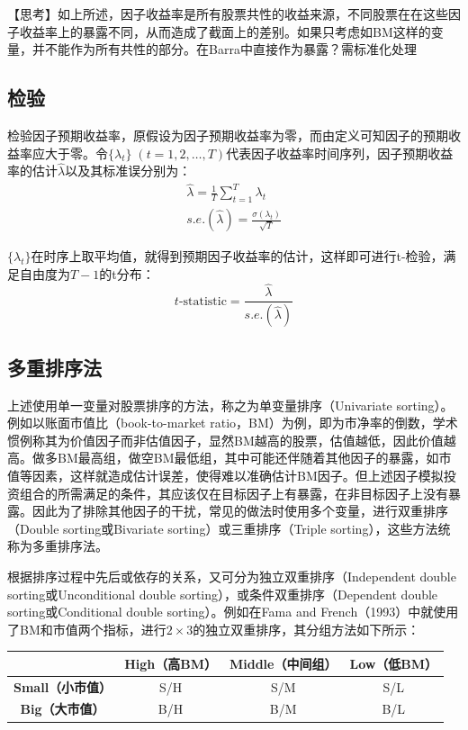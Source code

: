 \documentclass[11pt]{article}
\begin{document}
【思考】如上所述，因子收益率是所有股票共性的收益来源，不同股票在在这些因子收益率上的暴露不同，从而造成了截面上的差别。如果只考虑如BM这样的变量，并不能作为所有共性的部分。在Barra中直接作为暴露？需标准化处理

\subsection{检验}

检验因子预期收益率，原假设为因子预期收益率为零，而由定义可知因子的预期收益率应大于零。令$\{\lambda_t\} \; (t=1,2,\dots,T)$代表因子收益率时间序列，因子预期收益率的估计$\hat{\lambda}$以及其标准误分别为：
\begin{gather*}
    \hat{\lambda} = \frac{1}{T}\sum_{t=1}^{T} \lambda_t \\
    s.e.(\hat{\lambda}) = \frac{\sigma(\lambda_t)}{\sqrt{T}}
\end{gather*}

$\{\lambda_t\}$在时序上取平均值，就得到预期因子收益率的估计，这样即可进行t-检验，满足自由度为$T-1$的t分布：
\begin{equation*}
    t\text{-statistic} = \frac{\hat{\lambda}}{s.e.(\hat{\lambda})}
\end{equation*}

\subsection{多重排序法}

上述使用单一变量对股票排序的方法，称之为单变量排序（Univariate sorting）。例如以账面市值比（book-to-market ratio，BM）为例，即为市净率的倒数，学术惯例称其为价值因子而非估值因子，显然BM越高的股票，估值越低，因此价值越高。做多BM最高组，做空BM最低组，其中可能还伴随着其他因子的暴露，如市值等因素，这样就造成估计误差，使得难以准确估计BM因子。但上述因子模拟投资组合的所需满足的条件，其应该仅在目标因子上有暴露，在非目标因子上没有暴露。因此为了排除其他因子的干扰，常见的做法时使用多个变量，进行双重排序（Double sorting或Bivariate sorting）或三重排序（Triple sorting），这些方法统称为多重排序法。

根据排序过程中先后或依存的关系，又可分为独立双重排序（Independent double sorting或Unconditional double sorting），或条件双重排序（Dependent double sorting或Conditional double sorting）。例如在Fama and French（1993）中就使用了BM和市值两个指标，进行$2 \times 3$的独立双重排序，其分组方法如下所示：

\begin{table}[H]
\centering
\begin{tabular}{@{}cccc@{}}
\toprule
& \textbf{High（高BM）} & \textbf{Middle（中间组）} & \textbf{Low（低BM）} \\ \midrule
\textbf{Small（小市值）} & S/H & S/M & S/L \\
\textbf{Big（大市值）}   & B/H & B/M & B/L \\ \bottomrule
\end{tabular}
\end{table}
\end{document}
